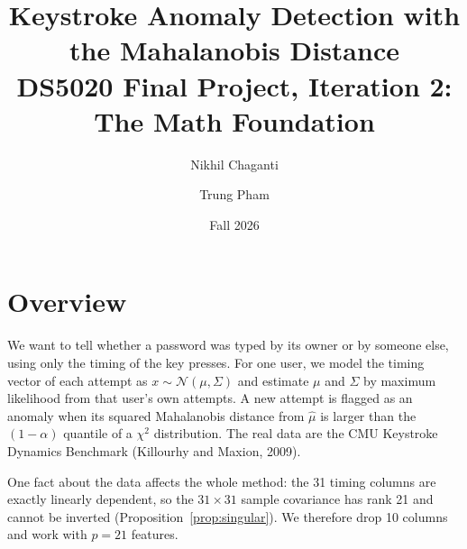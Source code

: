 \documentclass[11pt]{article}
\title{\textbf{Keystroke Anomaly Detection with the Mahalanobis Distance}\\[4pt]
\large DS5020 Final Project, Iteration 2: The Math Foundation}
\author{Nikhil Chaganti \and Trung Pham}
\date{Fall 2026}
\newcommand{\hmu}{\hat{\mu}}
\theoremstyle{plain}
\theoremstyle{definition}
\theoremstyle{remark}
\begin{document}
\maketitle
\tableofcontents

\section{Overview}
We want to tell whether a password was typed by its owner or by someone else,
using only the timing of the key presses. For one user, we model the timing
vector of each attempt as $x\sim\mathcal N(\mu,\Sigma)$ and estimate $\mu$ and
$\Sigma$ by maximum likelihood from that user's own attempts. A new attempt is
flagged as an anomaly when its squared Mahalanobis distance from $\hmu$ is larger
than the $(1-\alpha)$ quantile of a $\chi^2$ distribution. The real data are the
CMU Keystroke Dynamics Benchmark (Killourhy and Maxion, 2009).

One fact about the data affects the whole method: the 31 timing columns are
exactly linearly dependent, so the $31\times31$ sample covariance has rank 21 and
cannot be inverted (Proposition~\ref{prop:singular}). We therefore drop 10
columns and work with $p=21$ features.

\end{document}
